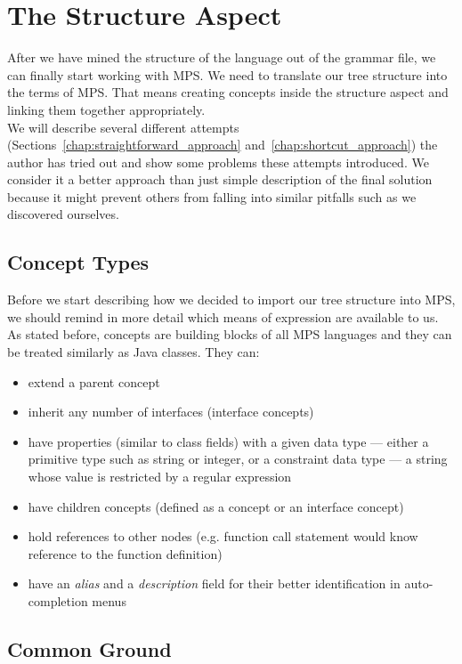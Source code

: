 \section{The Structure Aspect}

After we have mined the structure of the language out of the grammar file, we can finally start working with MPS.
We need to translate our tree structure into the terms of MPS.
That means creating concepts inside the structure aspect and linking them together appropriately.
\\

We will describe several different attempts (Sections~\ref{chap:straightforward_approach} and~\ref{chap:shortcut_approach}) the author has tried out and show some problems these attempts introduced.
We consider it a better approach than just simple description of the final solution because it might prevent others from falling into similar pitfalls such as we discovered ourselves.


\subsection{Concept Types}

Before we start describing how we decided to import our tree structure into MPS, we should remind in more detail which means of expression are available to us.
As stated before, concepts are building blocks of all MPS languages and they can be treated similarly as Java classes.
They can:

\begin{itemize}
	\item extend a parent concept
	\item inherit any number of interfaces (interface concepts)
	\item have properties (similar to class fields) with a given data type --- either a primitive type such as string or integer, or a constraint data type --- a string whose value is restricted by a regular expression
	\item have children concepts (defined as a concept or an interface concept)
	\item hold references to other nodes (e.g. function call statement would know reference to the function definition)
	\item have an \textit{alias} and a \textit{description} field for their better identification in auto-completion menus
\end{itemize}

\subsection{Common Ground}
\label{chap:common_ground}

